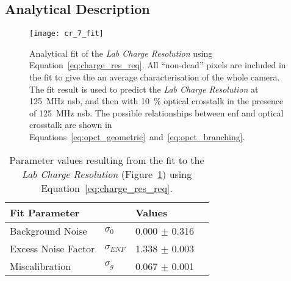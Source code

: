 \subsection{Analytical Description}

\begin{figure}[H]
	\centering
    \texttt{[image: cr\_7\_fit]} 
	\caption[Analytical fit of the \textit{Lab Charge Resolution}.]{Analytical fit of the \textit{Lab Charge Resolution} using Equation~\ref{eq:charge_res_req}. All ``non-dead'' pixels are included in the fit to give the an average characterisation of the whole camera. The fit result is used to predict the \textit{Lab Charge Resolution} at \SI{125}{MHz} \gls{nsb}, and then with \SI{10}{\percent} optical crosstalk in the presence of \SI{125}{MHz} \gls{nsb}. The possible relationships between \gls{enf} and optical crosstalk are shown in Equations~\ref{eq:opct_geometric}~and~\ref{eq:opct_branching}.}
	\label{fig:cr_7_fit}
\end{figure}

\begin{table}[h!]
\centering
\begin{tabular}{ll|ll} \toprule
    Fit Parameter        &                & Values             \\ \midrule
    Background Noise     & $\sigma_0$     & 0.000 $\pm$ 0.316  \\
    Excess Noise Factor  & $\sigma_{ENF}$ & 1.338 $\pm$ 0.003  \\
    Miscalibration       & $\sigma_g$     & 0.067 $\pm$ 0.001  \\ \bottomrule
\end{tabular}
\caption{Parameter values resulting from the fit to the \textit{Lab Charge Resolution} (Figure~\ref{fig:cr_7_fit}) using Equation~\ref{eq:charge_res_req}.}
\label{table:cr_7_fit}
\end{table}

